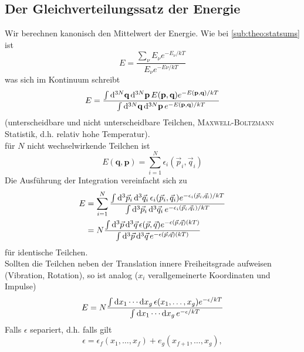 \subsection{Der Gleichverteilungssatz der Energie}
Wir berechnen kanonisch den Mittelwert der Energie. Wie bei \ref{sub:theo:statsums} ist 
\begin{equation}
    E = \frac{\sum_\nu E_\nu e^{- E_\nu / kT}}{E_\nu e^{-E\nu / kT}}
\end{equation}
was sich im Kontinuum schreibt
\begin{equation}
    E = \frac{\int \mathrm{d}^{3N} \textbf{q} \, \mathrm{d}^{3N} \textbf{p} \, E(\textbf{p}, \textbf{q}) e^{-E(\textbf{p}, \textbf{q})/kT}}{\int \mathrm{d}^{3N} \textbf{q} \, \mathrm{d}^{3N} \textbf{p} \, e^{-E(\textbf{p}, \textbf{q})/kT}}
\end{equation} 
(unterscheidbare und nicht unterscheidbare Teilchen, \textsc{Maxwell-Boltzmann} Statistik, d.h. relativ hohe Temperatur). \\
für $N$ nicht wechselwirkende Teilchen ist
\begin{equation}
    E(\textbf{q}, \textbf{p}) = \sum_{i=1}^{N} \epsilon_i(\vec{p}_i, \vec{q}_i)
\end{equation}
Die Ausführung der Integration vereinfacht sich zu
\begin{equation}
    \begin{split}
        E &= \sum_{i=1}^{N} \frac{\int \mathrm{d}^3 \vec{p}_i \, \mathrm{d}^3 \vec{q}_i \, \epsilon_i(\vec{p}_i, \vec{q}_i) e^{- \epsilon_i(\vec{p}_i, \vec{q}_i) / kT}}{\int \mathrm{d}^3 \vec{p}_i \, \mathrm{d}^3 \vec{q}_i \, e^{- \epsilon_i(\vec{p}_i, \vec{q}_i) / kT}} \\
        &= N \frac{\int \mathrm{d}^3 \vec{p} \, \mathrm{d}^3 \vec{q} \, \epsilon(\vec{p}, \vec{q}) e^{- \epsilon(\vec{p}, \vec{q})(kT)}}{\int \mathrm{d}^3 \vec{p} \, \mathrm{d}^3 \vec{q} \, e^{- \epsilon(\vec{p}, \vec{q})(kT)}}
    \end{split}
\end{equation}
für identische Teilchen. \\
Sollten die Teilchen neben der Translation innere Freiheitsgrade aufweisen (Vibration, Rotation), so ist analog ($x_i$ verallgemeinerte Koordinaten und Impulse)
\begin{equation}
    E = N \frac{\int \mathrm{d} x_1 \cdots \mathrm{d} x_g \, \epsilon(x_1, \ldots, x_g) e^{- \epsilon / kT}}{\int \mathrm{d} x_1 \cdots \mathrm{d} x_g \, e^{- \epsilon / kT}}
\end{equation}
Falls $\epsilon$ separiert, d.h. falls gilt
\begin{equation}
    \epsilon = \epsilon_f(x_1, \ldots, x_f) + e_g(x_{f+1}, \ldots, x_g),
\end{equation}
